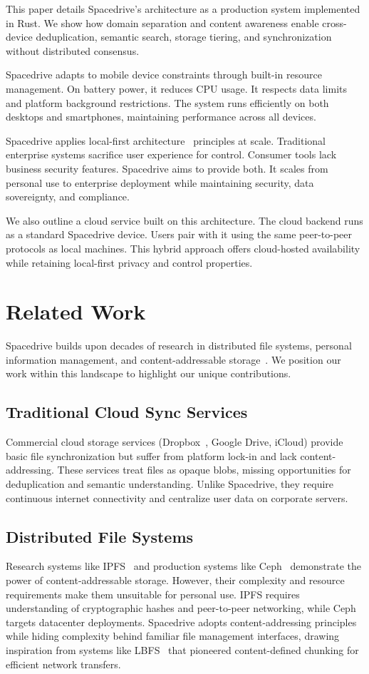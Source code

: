 \documentclass[sigconf]{acmart}
\begin{document}
This paper details Spacedrive's architecture as a production system implemented in Rust. We show how domain separation and content awareness enable cross-device deduplication, semantic search, storage tiering, and synchronization without distributed consensus.

Spacedrive adapts to mobile device constraints through built-in resource management. On battery power, it reduces CPU usage. It respects data limits and platform background restrictions. The system runs efficiently on both desktops and smartphones, maintaining performance across all devices.

Spacedrive applies local-first architecture~\cite{kleppmann_localfirst_2019} principles at scale. Traditional enterprise systems sacrifice user experience for control. Consumer tools lack business security features. Spacedrive aims to provide both. It scales from personal use to enterprise deployment while maintaining security, data sovereignty, and compliance.

We also outline a cloud service built on this architecture. The cloud backend runs as a standard Spacedrive device. Users pair with it using the same peer-to-peer protocols as local machines. This hybrid approach offers cloud-hosted availability while retaining local-first privacy and control properties.


\section{Related Work}
Spacedrive builds upon decades of research in distributed file systems, personal information management, and content-addressable storage~\cite{quinlan_venti_2002}. We position our work within this landscape to highlight our unique contributions.

\subsection{Traditional Cloud Sync Services}
Commercial cloud storage services (Dropbox~\cite{dropbox}, Google Drive, iCloud) provide basic file synchronization but suffer from platform lock-in and lack content-addressing. These services treat files as opaque blobs, missing opportunities for deduplication and semantic understanding. Unlike Spacedrive, they require continuous internet connectivity and centralize user data on corporate servers.

\subsection{Distributed File Systems}
Research systems like IPFS~\cite{ipfs} and production systems like Ceph~\cite{ceph} demonstrate the power of content-addressable storage. However, their complexity and resource requirements make them unsuitable for personal use. IPFS requires understanding of cryptographic hashes and peer-to-peer networking, while Ceph targets datacenter deployments. Spacedrive adopts content-addressing principles while hiding complexity behind familiar file management interfaces, drawing inspiration from systems like LBFS~\cite{muthitacharoen_lbfs_2001} that pioneered content-defined chunking for efficient network transfers.
\end{document}
